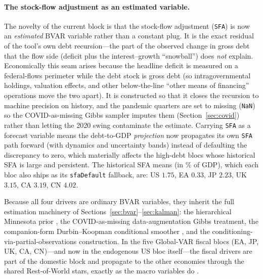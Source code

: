 \documentclass[11pt]{article}
\theoremstyle{definition}
\theoremstyle{remark}
\begin{document}
\paragraph{The stock-flow adjustment as an estimated variable.}
The novelty of the current block is that the stock-flow adjustment
(\texttt{SFA}) is now an \emph{estimated} BVAR variable rather than a constant
plug. It is the exact residual of the tool's own debt recursion---the part of
the observed change in gross debt that the flow side (deficit plus the
interest--growth ``snowball'') does \emph{not} explain. Economically this seam
arises because the headline deficit is measured on a federal-flows perimeter
while the debt stock is gross debt (so intragovernmental holdings, valuation
effects, and other below-the-line ``other means of financing'' operations move
the two apart). It is constructed so that it closes the recursion to machine
precision on history, and the pandemic quarters are set to missing
(\texttt{NaN}) so the COVID-as-missing Gibbs sampler imputes them
(Section~\ref{sec:covid}) rather than letting the 2020 swing contaminate the
estimate. Carrying \texttt{SFA} as a forecast variable means the
debt-to-GDP \emph{projection} now propagates its own \texttt{SFA} path forward
(with dynamics and uncertainty bands) instead of defaulting the discrepancy to
zero, which materially affects the high-debt blocs whose historical SFA is large
and persistent. The historical SFA means (in \% of GDP), which each bloc also
ships as its \texttt{sfaDefault} fallback, are: US $1.75$, EA $0.33$, JP $2.23$,
UK $3.15$, CA $3.19$, CN $4.02$.

Because all four drivers are ordinary BVAR variables, they inherit the full
estimation machinery of Sections~\ref{sec:bvar}--\ref{sec:kalman}: the
hierarchical Minnesota prior \citep{Giannone2015}, the COVID-as-missing
data-augmentation Gibbs treatment, the companion-form Durbin--Koopman
conditional smoother \citep{DurbinKoopman2002, DurbinKoopman2012}, and the
\citet{BanburaGiannoneLenza2015} conditioning-via-partial-observations
construction.  In the five Global-VAR fiscal blocs (EA, JP, UK, CA, CN)---and
now in the endogenous US bloc itself---the fiscal drivers are part of the
domestic block and propagate to the other economies through the shared
Rest-of-World stars, exactly as the macro variables do
\citep{PesaranSchuermannWeiner2004, DeesDiMauroPesaranSmith2007}.
\end{document}
